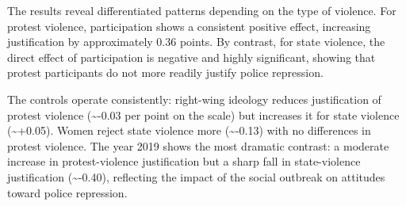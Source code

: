 \documentclass[
  13pt,
]{article}
\begin{document}
The results reveal differentiated patterns depending on the type of
violence. For protest violence, participation shows a consistent
positive effect, increasing justification by approximately 0.36 points.
By contrast, for state violence, the direct effect of participation is
negative and highly significant, showing that protest participants do
not more readily justify police repression.

The controls operate consistently: right-wing ideology reduces
justification of protest violence (\textasciitilde-0.03 per point on the
scale) but increases it for state violence (\textasciitilde+0.05). Women
reject state violence more (\textasciitilde-0.13) with no differences in
protest violence. The year 2019 shows the most dramatic contrast: a
moderate increase in protest-violence justification but a sharp fall in
state-violence justification (\textasciitilde-0.40), reflecting the
impact of the social outbreak on attitudes toward police repression.
\end{document}
